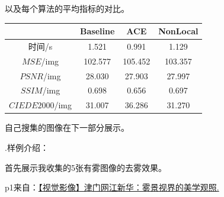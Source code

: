 \documentclass[12pt]{article}
\begin{document}
以及每个算法的平均指标的对比。
\begin{table}[!h]
\centering
\begin{tabular}{cccc} %
\toprule 
 & Baseline& ACE &NonLocal\\ 
\midrule
时间/s & 1.521	&0.991 	&1.129
  \\
$MSE$/img &102.577 	&105.452  &103.357 
 \\
$PSNR$/img  &28.030 	& 27.903 
&27.997 
 \\
$SSIM$/img & 0.698  &0.656	&0.697
\\
$CIEDE2000$/img & 31.007 & 36.286  & 31.270 \\
\bottomrule 
\end{tabular}
\end{table}\par
自己搜集的图像在下一部分展示。\\
\newpage
\begin{large}
    .样例介绍：\par
\end{large}首先展示我收集的5张有雾图像的去雾效果。\par
p1来自：\href{https://zhuanlan.zhihu.com/p/625819726}{【视觉影像】津门网江新华：雾景视界的美学观照.}
\end{document}
